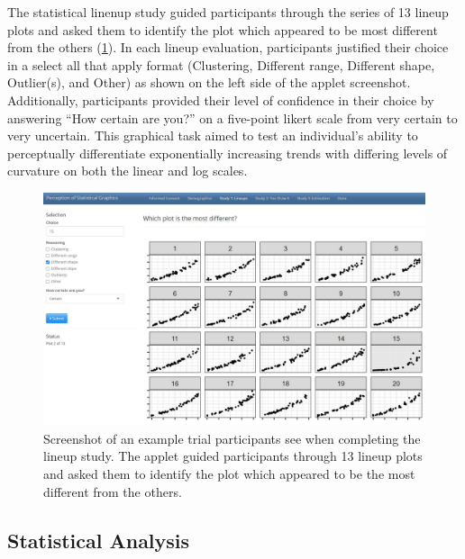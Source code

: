 \documentclass[12pt]{article}
\begin{document}
The statistical linenup study guided participants through the series of
13 lineup plots and asked them to identify the plot which appeared to be
most different from the others (\cref{fig:lineup-study-example-trial}).
In each lineup evaluation, participants justified their choice in a
select all that apply format (Clustering, Different range, Different
shape, Outlier(s), and Other) as shown on the left side of the applet
screenshot. Additionally, participants provided their level of
confidence in their choice by answering ``How certain are you?'' on a
five-point likert scale from very certain to very uncertain. This
graphical task aimed to test an individual's ability to perceptually
differentiate exponentially increasing trends with differing levels of
curvature on both the linear and log scales.

\begin{figure}[tbp]

{\centering \includegraphics[width=1\linewidth,]{images/lineup-study-example-trial} 

}

\caption[Lineup study example trial]{Screenshot of an example trial participants see when completing the lineup study. The applet guided participants through 13 lineup plots and asked them to identify the plot which appeared to be the most different from the others.}\label{fig:lineup-study-example-trial}
\end{figure}

\hypertarget{statistical-analysis}{%
\subsection{Statistical Analysis}\label{statistical-analysis}}
\end{document}
